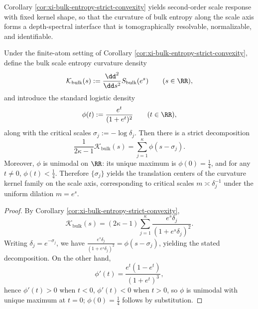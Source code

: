 
Corollary \ref{cor:xi-bulk-entropy-strict-convexity} yields second-order scale response with fixed kernel shape, so that the curvature of bulk entropy along the scale axis forms a depth-spectral interface that is tomographically resolvable, normalizable, and identifiable.

\begin{proposition}[Logistic kernel decomposition of scale entropy curvature: critical scales \texorpdfstring{$\sigma_j=-\log\delta_j$}{sigma_j=-log delta_j}]\label{prop:xi-bulk-curvature-logistic-kernel-decomposition}
Under the finite-atom setting of Corollary \ref{cor:xi-bulk-entropy-strict-convexity}, define the bulk scale entropy curvature density
\[
\mathcal{K}_{\mathrm{bulk}}(s):=\frac{\dd^{2}}{\dd s^{2}}S_{\mathrm{bulk}}(e^{s})\qquad(s\in\RR),
\]
and introduce the standard logistic density
\[
\phi(t):=\frac{e^{t}}{(1+e^{t})^{2}}\qquad(t\in\RR),
\]
along with the critical scales \(\sigma_j:=-\log\delta_j\).
Then there is a strict decomposition
\[
\boxed{\;
\frac{1}{2\kappa-1}\mathcal{K}_{\mathrm{bulk}}(s)=\sum_{j=1}^{\kappa}\phi(s-\sigma_j).\;}
\]
Moreover, \(\phi\) is unimodal on \(\RR\): its unique maximum is \(\phi(0)=\tfrac14\), and for any \(t\neq 0\), \(\phi(t)<\tfrac14\).
Therefore \(\{\sigma_j\}\) yields the translation centers of the curvature kernel family on the scale axis, corresponding to critical scales \(m\asymp \delta_j^{-1}\) under the uniform dilation \(m=e^s\).
\end{proposition}
\begin{proof}
By Corollary \ref{cor:xi-bulk-entropy-strict-convexity},
\[
\mathcal{K}_{\mathrm{bulk}}(s)
=(2\kappa-1)\sum_{j=1}^{\kappa}\frac{e^{s}\delta_j}{(1+e^{s}\delta_j)^{2}}.
\]
Writing \(\delta_j=e^{-\sigma_j}\), we have \(\frac{e^{s}\delta_j}{(1+e^{s}\delta_j)^{2}}=\phi(s-\sigma_j)\), yielding the stated decomposition.
On the other hand,
\[
\phi'(t)=\frac{e^{t}(1-e^{t})}{(1+e^{t})^{3}},
\]
hence \(\phi'(t)>0\) when \(t<0\), \(\phi'(t)<0\) when \(t>0\), so \(\phi\) is unimodal with unique maximum at \(t=0\); \(\phi(0)=\tfrac14\) follows by substitution.
\end{proof}

